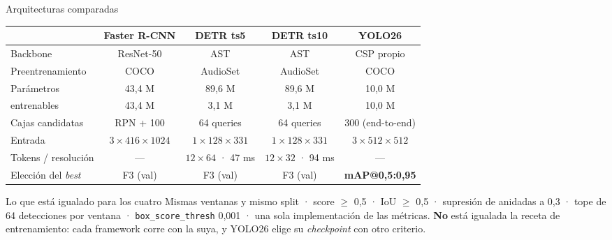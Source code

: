 \documentclass[aspectratio=169,10pt]{beamer}
\newcommand{\gris}[1]{{\color{cMuted}#1}}
\begin{document}
\begin{frame}{Arquitecturas comparadas}
  \centering
  \small
  \begin{tabular}{@{}lcccc@{}}
    \toprule
     & \textbf{\color{cFRCNN}Faster R-CNN} & \textbf{\color{cDETR}DETR ts5}
     & \textbf{\color{cDETRb}DETR ts10} & \textbf{\color{cYOLO}YOLO26} \\
    \midrule
    Backbone             & ResNet-50      & AST            & AST            & CSP propio \\
    Preentrenamiento     & COCO           & AudioSet        & AudioSet        & COCO \\
    Parámetros           & 43,4 M         & 89,6 M          & 89,6 M          & 10,0 M \\
    \gris{entrenables}   & \gris{43,4 M}  & \gris{3,1 M}    & \gris{3,1 M}    & \gris{10,0 M} \\
    Cajas candidatas     & RPN + 100      & 64 queries      & 64 queries      & 300 (end-to-end) \\
    Entrada              & $3\times416\times1024$ & $1\times128\times331$
                         & $1\times128\times331$ & $3\times512\times512$ \\
    Tokens / resolución  & ---            & $12\times64$ · 47 ms
                         & $12\times32$ · 94 ms & --- \\
    Elección del \textit{best} & F3 (val) & F3 (val)        & F3 (val)
                         & \textbf{mAP@0,5:0,95} \\
    \bottomrule
  \end{tabular}

  \medskip
  \begin{block}{Lo que está igualado para los cuatro}
    \small Mismas ventanas y mismo split · score $\geq$ 0,5 · IoU $\geq$ 0,5 ·
    supresión de anidadas a 0,3 · tope de 64 detecciones por ventana ·
    \texttt{box\_score\_thresh} 0,001 · una sola implementación de las métricas.
    \textbf{No} está igualada la receta de entrenamiento: cada framework corre con la
    suya, y YOLO26 elige su \textit{checkpoint} con otro criterio.
  \end{block}
\end{frame}
\end{document}
